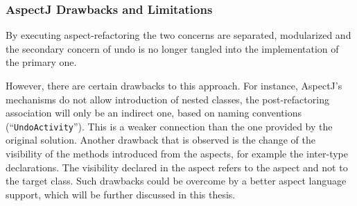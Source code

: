\subsubsection{AspectJ Drawbacks and Limitations}
By executing aspect-refactoring the two concerns are separated, modularized and the secondary concern of undo is no longer tangled into the implementation of the primary one.

However, there are certain drawbacks to this approach.
For instance, AspectJ's mechanisms do not allow introduction of nested classes, the post-refactoring association will only be an indirect one, based on naming conventions (``\texttt{UndoActivity}''). 
This is a weaker connection than the one provided by the original solution. 
Another drawback that is observed is the change of the visibility of the methods introduced from the aspects, for example the inter-type declarations. 
The visibility declared in the aspect refers to the aspect and not to the target class. 
Such drawbacks could be overcome by a better aspect language support, which will be further discussed in this thesis.
